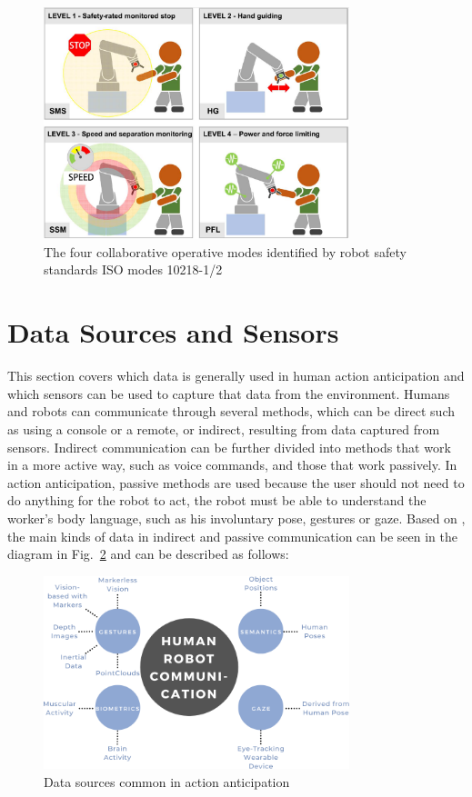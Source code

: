 \documentclass[conference]{IEEEtran}
\begin{document}
\begin{figure}[htbp]
\centerline{\includegraphics[width=3.5in]{figs/iso.png}}
\caption[The four collaborative operative modes identified by robot safety standards ISO modes 10218-1/2]{The four collaborative operative modes identified by robot safety standards ISO modes 10218-1/2 \cite{Villani2018}}
\label{isonorms}
\end{figure}

\section{Data Sources and Sensors}
\label{chapter:data_sources}

This section covers which data is generally used in human action anticipation and which sensors can be used to capture that data from the environment. Humans and robots can communicate through several methods, which can be direct such as using a console or a remote, or indirect, resulting from data captured from sensors. Indirect communication can be further divided into methods that work in a more active way, such as voice commands, and those that work passively. In action anticipation, passive methods are used because the user should not need to do anything for the robot to act, the robot must be able to understand the worker’s body language, such as his involuntary pose, gestures or gaze. Based on \cite{Castro2021, Mukherjee2022, Semeraro2023}, the main kinds of data in indirect and passive communication can be seen in the diagram in Fig.~\ref{interaction} and can be described as follows:

\begin{figure}[htbp]
\centerline{\includegraphics[width=3.5in]{figs/Action Anticipation methods.png}}
\caption{Data sources common in action anticipation}
\label{interaction}
\end{figure}
\end{document}
